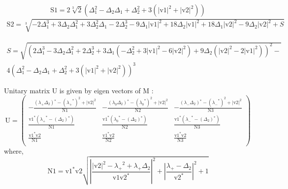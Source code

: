 \documentclass{article}
\begin{document}
\begin{equation}
\text{S1}=2 \sqrt[3]{2} \left(\Delta _1^2-\Delta _2 \Delta _1+\Delta _2^2+3 \left(\left|\text{v1}\right|^2+\left|\text{v2}\right|^2\right)\right)
 \end{equation}
 \begin{multline}
      \text{S2}=\sqrt[3]{-2 \Delta _1^3+3 \Delta _2 \Delta _1^2+3 \Delta _2^2 \Delta _1-2 \Delta _2^3-9 \Delta _1 \left|\text{v1}\right|^2+18 \Delta _2 \left|\text{v1}\right|^2+18 \Delta _1 \left|\text{v2}\right|^2-9 \Delta _2 \left|\text{v2}\right|^2+S}  
      \end{multline}
      
   \begin{multline}
S=\sqrt{\left(2 \Delta _1^3-3 \Delta _2 \Delta _1^2+2 \Delta _2^3+3 \Delta _1 \left(-\Delta _2^2+3 \left|\text{v1}\right|^2-6 \left|\text{v2}\right|^2\right)+9 \Delta _2\left(\left|\text{v2}\right|^2-2 \left|\text{v1}\right|^2\right)\right)^2-} \\ {
4 \left(\Delta _1^2-\Delta _2 \Delta _1+\Delta _2^2+3 \left(\left|\text{v1}\right|^2+\left|\text{v2}\right|^2\right)\right)^3}  
\end{multline}

Unitary matrix U is given by eigen vectors of M :
\begin{equation}
\text{U}=\left(
\begin{array}{ccc}
 -\frac{\left(\text{$\lambda_+$} \Delta _2\right){}^*-\left(\text{$\lambda_+$}^*\right)^2+\left|\text{v2}\right|^2}{\text{N1}} & -\frac{\left(\text{$\lambda_0$} \Delta _2\right){}^*-\left(\text{$\lambda_0$}^*\right)^2+\left|\text{v2}\right|^2}{\text{N2}}& -\frac{\left(\text{$\lambda_-$} \Delta _2\right){}^*-\left(\text{$\lambda_-$}^*\right)^2+\left|\text{v2}\right|^2}{\text{N3}}\\
 
\frac{\text{v1}^* \left(\text{$\lambda_+$}^*-\left(\Delta _2\right){}^*\right)}{\text{N1}} & \frac{\text{v1}^* \left(\text{$\lambda_0$}^*-\left(\Delta _2\right){}^*\right)}{\text{N2}} & \frac{\text{v1}^* \left(\text{$\lambda_-$}^*-\left(\Delta _2\right){}^*\right)}{\text{N3}} \\
\frac{\text{v1}^* \text{v2}}{\text{N1}} & \frac{\text{v1}^* \text{v2}}{\text{N2}} & \frac{\text{v1}^* \text{v2}}{\text{N3}} \\
\end{array}\right)
\end{equation}
 where,
\begin{equation}
\text{N1}=\text{v1}^* \text{v2} \sqrt{{\left| \frac{\left|\text{v2}\right|^2-\text{$\lambda_+$}^2+\text{$\lambda_+$} \Delta _2}{\text{v1} \text{v2}^*}\right|}^2+{\left| \frac{\text{$\lambda_+$}-\Delta _2}{\text{v2}^*}\right|}^2+1}
\end{equation}
\end{document}

